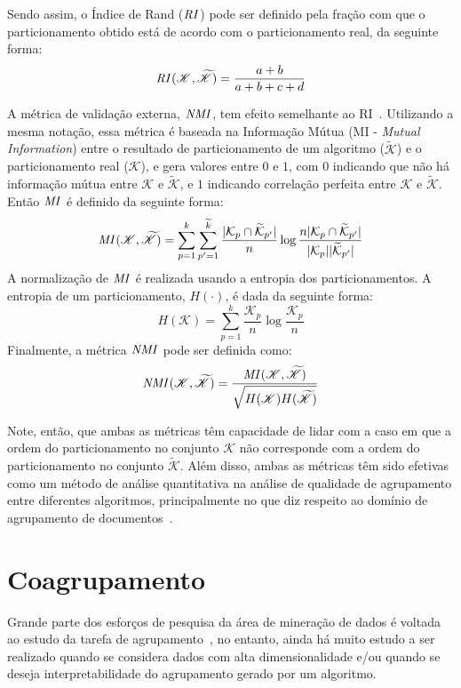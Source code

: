 \documentclass[
    12pt,                %
    oneside,            %
    a4paper,            %
    english,            %
    brazil                %
    ]{abntex2ppgsi}
\begin{document}
Sendo assim, o Índice de Rand ($\text{\textit{RI}}$) pode ser definido pela fração com que o particionamento obtido está de acordo com o particionamento real, da seguinte forma:
\[
    \text{\textit{RI}}(\mathscr{K}, \mathscr{\widetilde{K}}) = \frac{a + b}{a + b + c + d}
\]

A métrica de validação externa, $\text{\textit{NMI}}$, tem efeito semelhante ao RI~\cite{Manning2008}.
Utilizando a mesma notação, essa métrica é baseada na Informação Mútua (MI - \textit{Mutual Information}) entre o resultado de particionamento de um algoritmo ($\mathscr{\widetilde{K}}$) e o particionamento real ($\mathscr{K}$), e gera valores entre $0$ e $1$, com $0$ indicando que não há informação mútua entre $\mathscr{K}$ e $\mathscr{\widetilde{K}}$, e $1$ indicando correlação perfeita entre $\mathscr{K}$ e $\mathscr{\widetilde{K}}$.
Então $\text{\textit{MI}}$ é definido da seguinte forma:
\[
    \text{\textit{MI}}(\mathscr{K}, \mathscr{\widetilde{K}}) = \displaystyle \sum_{p=1}^k \sum_{p'=1}^{\widetilde{k}} \frac{|\mathcal{K}_p \cap \mathcal{\widetilde{K}}_{p'}|}{n} \log \frac{n |\mathcal{K}_p \cap \mathcal{\widetilde{K}}_{p'}|}{|\mathcal{K}_p| |\mathcal{\widetilde{K}}_{p'}|}
\]
A normalização de $\text{\textit{MI}}$ é realizada usando a entropia dos particionamentos.
A entropia de um particionamento, $H(\cdot)$, é dada da seguinte forma:
\[
    H(\mathscr{K}) = \displaystyle \sum_{p=1}^k \frac{\mathcal{K}_p}{n} \log \frac{\mathcal{K}_p}{n}
\]
Finalmente, a métrica $\text{\textit{NMI}}$ pode ser definida como:
\[
    \text{\textit{NMI}}(\mathscr{K}, \mathscr{\widetilde{K}}) = \frac{\text{\textit{MI}}(\mathscr{K}, \mathscr{\widetilde{K}})}{\sqrt{H(\mathscr{K}) H(\mathscr{\widetilde{K}})}}
\]

Note, então, que ambas as métricas têm capacidade de lidar com a caso em que a ordem do particionamento no conjunto $\mathscr{K}$ não corresponde com a ordem do particionamento no conjunto $\mathscr{\widetilde{K}}$.
Além disso, ambas as métricas têm sido efetivas como um método de análise quantitativa na análise de qualidade de agrupamento entre diferentes algoritmos, principalmente no que diz respeito ao domínio de agrupamento de documentos~\cite{Kuang2014,Ho2008,Wang2011,Ding06,Xu2003,Yoo2010}.

\section{Coagrupamento}
\label{sec:coclustering}

Grande parte dos esforços de pesquisa da área de mineração de dados é voltada ao estudo da tarefa de agrupamento~\cite{Han2011}, no entanto, ainda há muito estudo a ser realizado quando se considera dados com alta dimensionalidade e/ou quando se deseja interpretabilidade do agrupamento gerado por um algoritmo.
\end{document}
